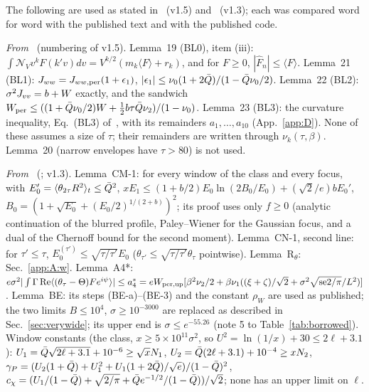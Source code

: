 The following are used as stated in~\cite{F} (v1.5) and~\cite{H} (v1.3); each was compared word for word with the published text and with the published code.

\emph{From~\cite{F}} (numbering of v1.5).
Lemma~19 (BL0), item (iii): $\int\mathcal N_Vv^kF(k'v)dv=V^{k/2}(m_k\langle F\rangle+r_k)$, and for $F\ge0$, $|\hat F_n|\le\langle F\rangle$.
Lemma~21 (BL1): $J_{ww}=J_{ww,{\rm per}}(1+\epsilon_1)$, $|\epsilon_1|\le\nu_0(1+2\bar Q)/(1-\bar Q\nu_0/2)$.
Lemma~22 (BL2): $\sigma^2J_{vv}=b+W$ exactly, and the sandwich $W_{\rm per}\le((1+\bar Q\nu_0/2)W+\frac12b\tau\bar Q\nu_2)/(1-\nu_0)$.
Lemma~23 (BL3): the curvature inequality, Eq.~(BL3) of~\cite{F}, with its remainders $a_1,\dots,a_{10}$ (App.~\ref{app:D}).
None of these assumes a size of $\tau$; their remainders are written through $\nu_k(\tau,\beta)$. Lemma~20 (narrow envelopes have $\tau>80$) is not used.

\emph{From~\cite{H}} (; v1.3).
Lemma~CM-1: for every window of the class and every focus, with $E_0'=\langle\theta_{2\tau}R^2\rangle_t\le\bar Q^2$,
$xE_1\le(1+b/2)E_0\ln(2B_0/E_0)+(\sqrt2/e)bE_0'$, $B_0=(1+\sqrt{E_0}+(E_0/2)^{1/(2+b)})^2$; its proof uses only $f\ge0$ (analytic continuation of the blurred profile, Paley--Wiener for the Gaussian focus, and a dual of the Chernoff bound for the second moment).
Lemma~CN-1, second line: for $\tau'\le\tau$, $E_0^{(\tau')}\le\sqrt{\tau/\tau'}E_0$ ($\theta_{\tau'}\le\sqrt{\tau/\tau'}\theta_\tau$ pointwise).
Lemma~R$_\theta$: Sec.~\ref{app:A:w}.
Lemma~A4*: $e\sigma^2|\int\Gamma\,\mathrm{Re}\langle(\theta_\tau-\Theta)Fe^{i\psi}\rangle|\le a_4^*=eW_{\rm per,up}[\beta^2\nu_2/2+\beta\nu_1((\xi+\zeta)/\sqrt2+\sigma^2\sqrt{\mathrm{se2}/\pi}/L^2)]$.
Lemma~BE: its steps (BE-a)--(BE-3) and the constant $\rho_W$ are used as published; the two limits $B\le10^4$, $\sigma\ge10^{-3000}$ are replaced as described in Sec.~\ref{sec:verywide}; its upper end is $\sigma\le e^{-55.26}$ (note 5 to Table~\ref{tab:borrowed}).
Window constants (the class, $x\ge5\times10^{11}\sigma^2$, so $U^2=\ln(1/x)+30\le2\ell+3.1$): $U_1=\bar Q\sqrt{2\ell+3.1}+10^{-6}\ge\sqrt xN_1$, $U_2=\bar Q(2\ell+3.1)+10^{-4}\ge xN_2$, $\gamma_P=(U_2(1+\bar Q)+U_1^2+U_1(1+2\bar Q)/\sqrt e)/(1-\bar Q)^2$, $c_\chi=(U_1/(1-\bar Q)+\sqrt{2/\pi}+\bar Q e^{-1/2}/(1-\bar Q))/\sqrt2$; none has an upper limit on $\ell$.

